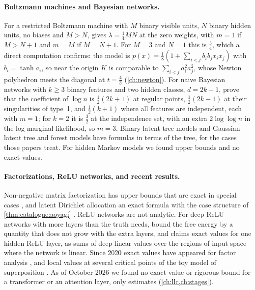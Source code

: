 \begin{refsection}
\paragraph{Boltzmann machines and Bayesian networks.} For a restricted Boltzmann machine with $M$ binary visible units, $N$ binary hidden units, no biases and $M>N$, \textcite[Theorem~3]{Aoyagi2010b} gives $\lambda=\frac14MN$ at the zero weights, with $m=1$ if $M>N+1$ and $m=M$ if $M=N+1$. For $M=3$ and $N=1$ this is $\frac34$, which a direct computation confirms: the model is $p(x)=\frac18(1+\sum_{i<j}b_ib_jx_ix_j)$ with $b_i=\tanh a_i$, so near the origin $K$ is comparable to $\sum_{i<j}a_i^2a_j^2$, whose Newton polyhedron meets the diagonal at $t=\frac43$ (\cref{ch:newton}). For naive Bayesian networks with $k\ge3$ binary features and two hidden classes, $d=2k+1$, \textcite[Theorem~4]{RusakovGeiger2005} prove that the coefficient of $\log n$ is $\frac12(2k+1)$ at regular points, $\frac12(2k-1)$ at their singularities of type~1, and $\frac12(k+1)$ where all features are independent, each with $m=1$; for $k=2$ it is $\frac32$ at the independence set, with an extra $2\log\log n$ in the log marginal likelihood, so $m=3$. Binary latent tree models \parencite{Zwiernik2011} and Gaussian latent tree and forest models \parencite{DrtonEtAl2017} have formulas in terms of the tree, for the cases those papers treat. For hidden Markov models we found upper bounds \parencite{YamazakiWatanabe2005b} and no exact values.

\paragraph{Factorizations, ReLU networks, and recent results.} Non-negative matrix factorization has upper bounds that are exact in special cases \parencite{HayashiWatanabe2017a}, and latent Dirichlet allocation an exact formula with the case structure of \cref{thm:catalogue:aoyagi} \parencite{Hayashi2021}. ReLU networks are not analytic. For deep ReLU networks with more layers than the truth needs, \textcite[a preprint]{NagayasuWatanabe2023} bound the free energy by a quantity that does not grow with the extra layers, and \textcite[a preprint]{Aoyagi2025} claims exact values for one hidden ReLU layer, as sums of deep-linear values over the regions of input space where the network is linear. Since 2020 exact values have appeared for factor analysis \parencite[a preprint]{DrtonEtAl2025}, and local values at several critical points of the toy model of superposition \parencite[a preprint]{ChenEtAl2023}. As of October 2026 we found no exact value or rigorous bound for a transformer or an attention layer, only estimates (\cref{ch:llc,ch:stages}).


\end{refsection}
